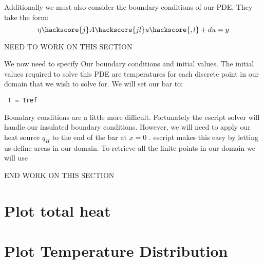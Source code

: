 Additionally we must also consider the boundary conditions of our PDE. They take the form:
\begin{equation}
\eta \hackscore{j} A\hackscore{jl} u\hackscore{,l} + du = y
\end{equation}


NEED TO WORK ON THIS SECTION

We now need to specify Our boundary conditions and initial values. The initial values required to solve this PDE are temperatures for each discrete point in our domain that we wish to solve for. We will set our bar to:
\begin{verbatim}
 T = Tref
\end{verbatim}
Boundary conditions are a little more difficult. Fortunately the escript solver will handle our insulated boundary conditions. However, we will need to apply our heat source $q_{H}$ to the end of the bar at $x=0$ . escript makes this easy by letting us define areas in our domain. To retrieve all the finite points in our domain we will use 

END WORK ON THIS SECTION

\section{Plot total heat} 


\section{Plot Temperature Distribution}

